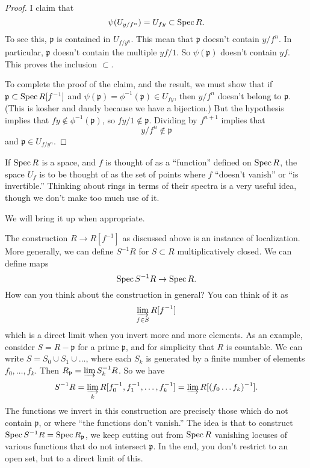 \begin{proof}
I claim that
\[ \psi(U_{y/f^n}) = U_{fy} \subset \operatorname{Spec} R.  \]
To see this, $\mathfrak{p}$ is contained in $U_{f/y^n}$. This
mean that
$\mathfrak{p}$ doesn't contain $y/f^n$. In particular,
$\mathfrak{p}$ doesn't
contain the multiple $yf/1$. So $\psi(\mathfrak{p})$ doesn't
contain $yf$.
This proves the inclusion $\subset$.  

To complete the proof of the claim, and
the result, we must show that if $\mathfrak{p} \subset \operatorname{Spec}
R[f^{-1}]$ and
$\psi(\mathfrak{p}) = \phi^{-1}(\mathfrak{p}) \in U_{fy}$, then
$y/f^n$ doesn't
belong to $\mathfrak{p}$. (This is kosher and dandy because we
have a bijection.) But the hypothesis implies that $fy \notin
\phi^{-1}(\mathfrak{p})$, so $fy/1 \notin \mathfrak{p}$.
Dividing by $f^{n+1}$
implies that
\[ y/f^{n} \notin \mathfrak{p}  \]
and $\mathfrak{p} \in U_{f/y^n}$. 
\end{proof}

If $\operatorname{Spec} R$ is a space, and $f$ is thought of as a ``function''
defined on
$\operatorname{Spec} R$, the space $U_f$ is to be thought of as the set of
points where $f$
``doesn't vanish'' or ``is invertible.''
Thinking about rings in terms of their spectra is a very useful
idea, though we
don't make too much use of it. 

We will bring it up when appropriate.  

\begin{remark} 
The construction $R \to R[f^{-1}]$ as discussed above is an
instance of
localization. More generally, we can define $S^{-1}R$ for $S
\subset R$
multiplicatively closed. We can define maps
\[ \operatorname{Spec} S^{-1}R \to \operatorname{Spec} R . \]
How can you think about the construction in general? You can
think of it as
\[ \varinjlim_{f \in S} R[f^{-1}]  \]
which is a direct limit when you invert more and more elements.
As an example, consider $S = R - \mathfrak{p}$ for a prime
$\mathfrak{p}$, and for
simplicity that $R$ is countable. We can write $S =
S_0 \cup S_1 \cup \dots$, where each $S_k$ is generated by a
finite number of
elements $f_0, \dots, f_k$. Then $R_{\mathfrak{p}} = \varinjlim
S_k^{-1} R$.
So we have
\[ S^{-1}R = \varinjlim_k R[f_0^{-1} , f_1^{-1}, \dots, f_k^{-1}
] = \varinjlim
R[(f_0\dots f_k)^{-1}]. \]
The functions we invert in this construction are precisely those
which do not
contain $\mathfrak{p}$, or where ``the functions don't vanish.''
The idea is
that to construct $\operatorname{Spec} S^{-1}R = \operatorname{Spec} R_{\mathfrak{p}}$, we
keep cutting out
from $\operatorname{Spec} R$ vanishing locuses of various functions that do
not
intersect $\mathfrak{p}$. In the end, you don't restrict to an
open set, but
to a direct limit of this.
\end{remark} 

